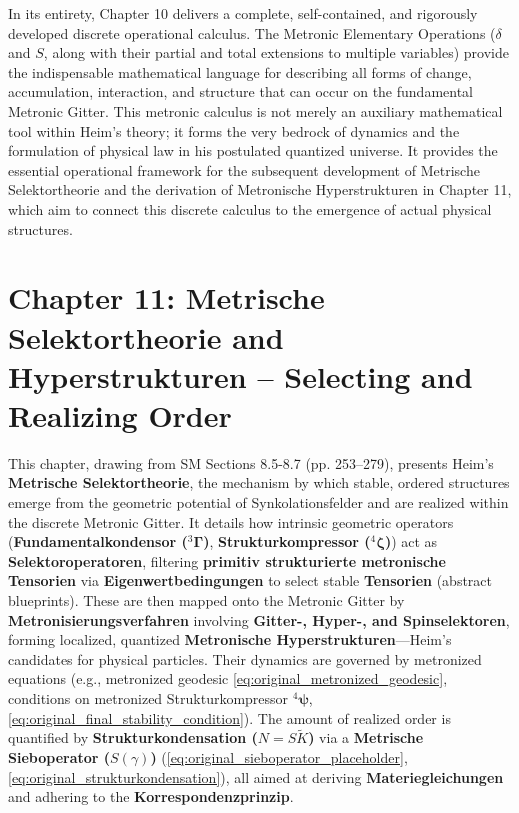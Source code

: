 \documentclass[12pt]{article}
\newcommand{\fundamentalkondensor}{{}^3\bm{\Gamma}}
\newcommand{\metrondifferential}{\delta}
\newcommand{\metronintegral}{S}
\newcommand{\metrischesieboperator}{S(\gamma)}
\newcommand{\strukturkompressor}{{}^4\bm{\zeta}}
\newcommand{\metronischerstrukturkompressor}{{}^4\bm{\psi}}
\begin{document}
In its entirety, Chapter 10 delivers a complete, self-contained, and rigorously developed discrete operational calculus. The Metronic Elementary Operations (\( \metrondifferential \) and \( \metronintegral \), along with their partial and total extensions to multiple variables) provide the indispensable mathematical language for describing all forms of change, accumulation, interaction, and structure that can occur on the fundamental Metronic Gitter. This metronic calculus is not merely an auxiliary mathematical tool within Heim's theory; it forms the very bedrock of dynamics and the formulation of physical law in his postulated quantized universe. It provides the essential operational framework for the subsequent development of Metrische Selektortheorie and the derivation of Metronische Hyperstrukturen in Chapter 11, which aim to connect this discrete calculus to the emergence of actual physical structures.

\clearpage 
\section{Chapter 11: Metrische Selektortheorie and Hyperstrukturen – Selecting and Realizing Order}
\label{sec:chapter11}

This chapter, drawing from SM Sections 8.5-8.7 (pp. 253–279), presents Heim's \textbf{Metrische Selektortheorie}, the mechanism by which stable, ordered structures emerge from the geometric potential of Synkolationsfelder and are realized within the discrete Metronic Gitter. It details how intrinsic geometric operators (\textbf{Fundamentalkondensor (\(\fundamentalkondensor\))}, \textbf{Strukturkompressor (\(\strukturkompressor\))}) act as \textbf{Selektoroperatoren}, filtering \textbf{primitiv strukturierte metronische Tensorien} via \textbf{Eigenwertbedingungen} to select stable \textbf{Tensorien} (abstract blueprints). These are then mapped onto the Metronic Gitter by \textbf{Metronisierungsverfahren} involving \textbf{Gitter-, Hyper-, and Spinselektoren}, forming localized, quantized \textbf{Metronische Hyperstrukturen}—Heim's candidates for physical particles. Their dynamics are governed by metronized equations (e.g., metronized geodesic \eqref{eq:original_metronized_geodesic}, conditions on metronized Strukturkompressor \(\metronischerstrukturkompressor\), \eqref{eq:original_final_stability_condition}). The amount of realized order is quantified by \textbf{Strukturkondensation (\(N = S\tilde{K}\))} via a \textbf{Metrische Sieboperator (\(\metrischesieboperator\))} (\eqref{eq:original_sieboperator_placeholder}, \eqref{eq:original_strukturkondensation}), all aimed at deriving \textbf{Materiegleichungen} and adhering to the \textbf{Korrespondenzprinzip}.
\end{document}
